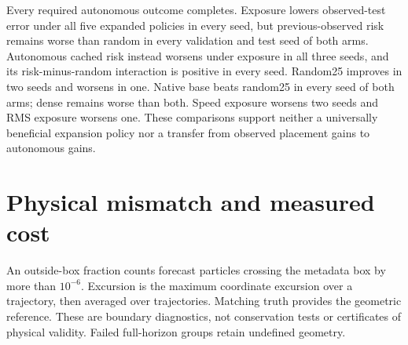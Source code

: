 Every required autonomous outcome completes. Exposure lowers observed-test error under all five expanded policies in every seed, but previous-observed risk remains worse than random in every validation and test seed of both arms. Autonomous cached risk instead worsens under exposure in all three seeds, and its risk-minus-random interaction is positive in every seed. Random25 improves in two seeds and worsens in one. Native base beats random25 in every seed of both arms; dense remains worse than both. Speed exposure worsens two seeds and RMS exposure worsens one. These comparisons support neither a universally beneficial expansion policy nor a transfer from observed placement gains to autonomous gains.

\section{Physical mismatch and measured cost}
\label{sec:physical-cost}
An outside-box fraction counts forecast particles crossing the metadata box by more than $10^{-6}$. Excursion is the maximum coordinate excursion over a trajectory, then averaged over trajectories. Matching truth provides the geometric reference. These are boundary diagnostics, not conservation tests or certificates of physical validity. Failed full-horizon groups retain undefined geometry.

